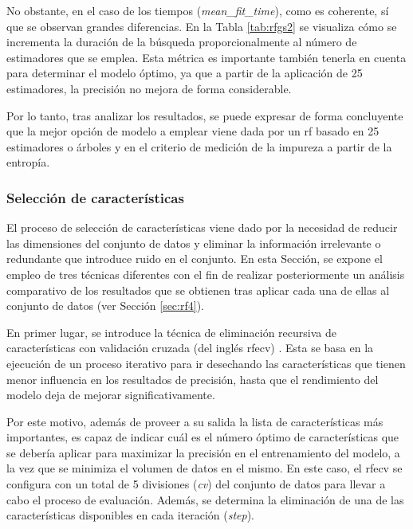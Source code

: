 No obstante, en el caso de los tiempos (\textit{mean\_fit\_time}), como es coherente, sí que se observan grandes diferencias. En la Tabla \ref{tab:rfgs2} se visualiza cómo se incrementa la duración de la búsqueda proporcionalmente al número de estimadores que se emplea. Esta métrica es importante también tenerla en cuenta para determinar el modelo óptimo, ya que a partir de la aplicación de 25 estimadores, la precisión no mejora de forma considerable.

\vspace{3mm}

Por lo tanto, tras analizar los resultados, se puede expresar de forma concluyente que la mejor opción de modelo a emplear viene dada por un \gls{rf} basado en 25 estimadores o árboles y en el criterio de medición de la impureza a partir de la entropía.

\subsubsection{Selección de características}
\label{sec:rf3}

El proceso de selección de características viene dado por la necesidad de reducir las dimensiones del conjunto de datos y eliminar la información irrelevante o redundante que introduce ruido en el conjunto. En esta Sección, se expone el empleo de tres técnicas diferentes con el fin de realizar posteriormente un análisis comparativo de los resultados que se obtienen tras aplicar cada una de ellas al conjunto de datos (ver Sección \ref{sec:rf4}).

\vspace{3mm}

En primer lugar, se introduce la técnica de eliminación recursiva de características con validación cruzada (del inglés \gls{rfecv}) \cite{rfecv}. Esta se basa en la ejecución de un proceso iterativo para ir desechando las características que tienen menor influencia en los resultados de precisión, hasta que el rendimiento del modelo deja de mejorar significativamente. 

\vspace{3mm}

Por este motivo, además de proveer a su salida la lista de características más importantes, es capaz de indicar cuál es el número óptimo de características que se debería aplicar para maximizar la precisión en el entrenamiento del modelo, a la vez que se minimiza el volumen de datos en el mismo. En este caso, el \gls{rfecv} se configura con un total de 5 divisiones (\textit{cv}) del conjunto de datos para llevar a cabo el proceso de evaluación. Además, se determina la eliminación de una de las características disponibles en cada iteración (\textit{step}). 

